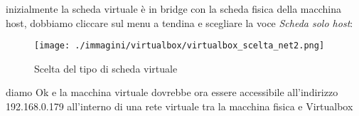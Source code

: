 inizialmente la scheda virtuale è in bridge con la scheda fisica della macchina host, dobbiamo cliccare sul menu a tendina e scegliare la voce \textsl{Scheda solo host}:

\begin{figure}[H]
 \centering
 \texttt{[image: ./immagini/virtualbox/virtualbox\_scelta\_net2.png]}
 \caption{Scelta del tipo di scheda virtuale}
 \label{fig:virt_rete_2}
\end{figure}
diamo Ok e la macchina virtuale dovrebbe ora essere accessibile all'indirizzo 192.168.0.179 all'interno di una rete virtuale tra la macchina fisica e Virtualbox